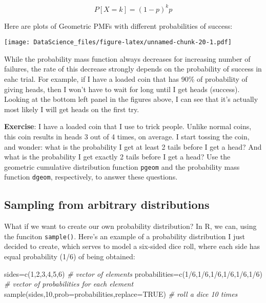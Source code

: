 \documentclass[
]{book}
\newenvironment{Shaded}{\begin{snugshade}}{\end{snugshade}}
\newcommand{\AttributeTok}[1]{\textcolor[rgb]{0.77,0.63,0.00}{#1}}
\newcommand{\CommentTok}[1]{\textcolor[rgb]{0.56,0.35,0.01}{\textit{#1}}}
\newcommand{\ConstantTok}[1]{\textcolor[rgb]{0.00,0.00,0.00}{#1}}
\newcommand{\DecValTok}[1]{\textcolor[rgb]{0.00,0.00,0.81}{#1}}
\newcommand{\FunctionTok}[1]{\textcolor[rgb]{0.00,0.00,0.00}{#1}}
\newcommand{\NormalTok}[1]{#1}
\newcommand{\OtherTok}[1]{\textcolor[rgb]{0.56,0.35,0.01}{#1}}
\newcommand{\SpecialCharTok}[1]{\textcolor[rgb]{0.00,0.00,0.00}{#1}}
\begin{document}
\[P[X = k] = (1-p)^k p \]

Here are plots of Geometric PMFs with different probabilities of success:

\texttt{[image: DataScience\_files/figure-latex/unnamed-chunk-20-1.pdf]}

While the probability mass function always decreases for increasing number of failures, the rate of this decrease strongly depends on the probability of success in eahc trial. For example, if I have a loaded coin that has 90\% of probability of giving heads, then I won't have to wait for long until I get heads (success). Looking at the bottom left panel in the figures above, I can see that it's actually most likely I will get heads on the first try.

\textbf{Exercise}: I have a loaded coin that I use to trick people. Unlike normal coins, this coin results in heads 3 out of 4 times, on average. I start tossing the coin, and wonder: what is the probability I get at least 2 tails before I get a head? And what is the probability I get exactly 2 tails before I get a head? Use the geometric cumulative distribution function \texttt{pgeom} and the probability mass function \texttt{dgeom}, respectively, to answer these questions.

\hypertarget{sampling-from-arbitrary-distributions}{%
\subsection{Sampling from arbitrary distributions}\label{sampling-from-arbitrary-distributions}}

What if we want to create our own probability distribution? In R, we can, using the funciton \texttt{sample()}. Here's an example of a probability distribution I just decided to create, which serves to model a six-sided dice roll, where each side has equal probability (1/6) of being obtained:

\begin{Shaded}
\begin{Highlighting}[]
\NormalTok{sides}\OtherTok{=}\FunctionTok{c}\NormalTok{(}\DecValTok{1}\NormalTok{,}\DecValTok{2}\NormalTok{,}\DecValTok{3}\NormalTok{,}\DecValTok{4}\NormalTok{,}\DecValTok{5}\NormalTok{,}\DecValTok{6}\NormalTok{) }\CommentTok{\# vector of elements}
\NormalTok{probabilities}\OtherTok{=}\FunctionTok{c}\NormalTok{(}\DecValTok{1}\SpecialCharTok{/}\DecValTok{6}\NormalTok{,}\DecValTok{1}\SpecialCharTok{/}\DecValTok{6}\NormalTok{,}\DecValTok{1}\SpecialCharTok{/}\DecValTok{6}\NormalTok{,}\DecValTok{1}\SpecialCharTok{/}\DecValTok{6}\NormalTok{,}\DecValTok{1}\SpecialCharTok{/}\DecValTok{6}\NormalTok{,}\DecValTok{1}\SpecialCharTok{/}\DecValTok{6}\NormalTok{) }\CommentTok{\# vector of probabilities for each element}
\FunctionTok{sample}\NormalTok{(sides,}\DecValTok{10}\NormalTok{,}\AttributeTok{prob=}\NormalTok{probabilities,}\AttributeTok{replace=}\ConstantTok{TRUE}\NormalTok{) }\CommentTok{\# roll a dice 10 times}
\end{Highlighting}
\end{Shaded}
\end{document}
